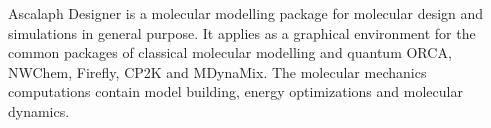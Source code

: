 Ascalaph Designer is a molecular modelling package for molecular design and simulations in general purpose. It applies as a graphical environment for the common packages of classical molecular modelling and quantum ORCA, NWChem, Firefly, CP2K and MDynaMix. The molecular mechanics computations contain model building, energy optimizations and molecular dynamics. 